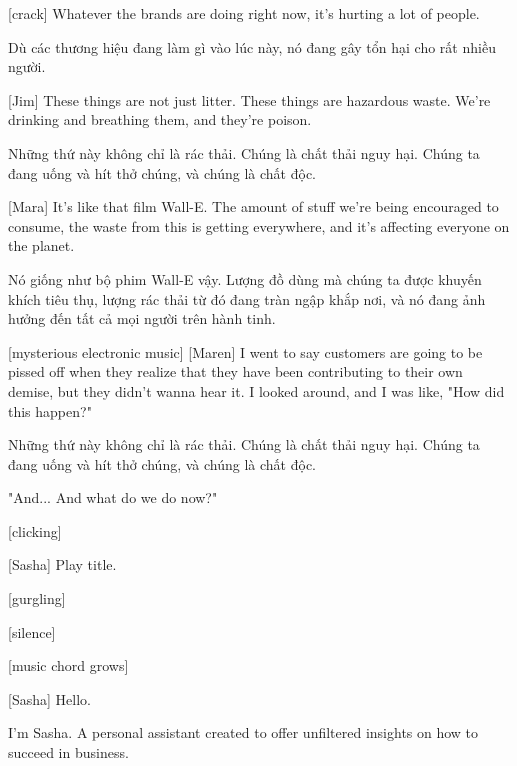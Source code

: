 \documentclass[a4paper]{article}
\begin{document}
	[crack]
	Whatever the brands are doing right now, it's hurting a lot of people.
	
	\begin{vietnamese-v2}
		[Bể nứt]
		
		Dù các thương hiệu đang làm gì vào lúc này, nó đang gây tổn hại cho rất nhiều người.
	\end{vietnamese-v2}
	
	[Jim] These things are not just litter. These things are hazardous waste. We're drinking and breathing them, and they're poison.

	\begin{vietnamese-v2}
		[Jim] Những thứ này không chỉ là rác thải. Chúng là chất thải nguy hại. Chúng ta đang uống và hít thở chúng, và chúng là chất độc.
	\end{vietnamese-v2}
	
	[Mara] It's like that film Wall-E. The amount of stuff we're being encouraged to consume, the waste from this is getting everywhere, and it's affecting everyone on the planet.
	
	\begin{vietnamese-v2}
		[Mara] Nó giống như bộ phim Wall-E vậy. Lượng đồ dùng mà chúng ta được khuyến khích tiêu thụ, lượng rác thải từ đó đang tràn ngập khắp nơi, và nó đang ảnh hưởng đến tất cả mọi người trên hành tinh.
	\end{vietnamese-v2}
	
	[mysterious electronic music]
	[Maren] I went to say customers are going to be pissed off when they realize that they have been contributing to their own demise, but they didn't wanna hear it. I looked around, and I was like, "How did this happen?" 
	
	\begin{vietnamese-v2}
		[Jim] Những thứ này không chỉ là rác thải. Chúng là chất thải nguy hại. Chúng ta đang uống và hít thở chúng, và chúng là chất độc.
	\end{vietnamese-v2}
	
	"And... And what do we do now?"
	
	[clicking]
	
	[Sasha] Play title.
	
	[gurgling]
	
	[silence]
	
	[music chord grows]
	
	[Sasha] Hello.
	
	I'm Sasha. A personal assistant created to offer unfiltered insights on how to succeed in business.
	
\end{document}
